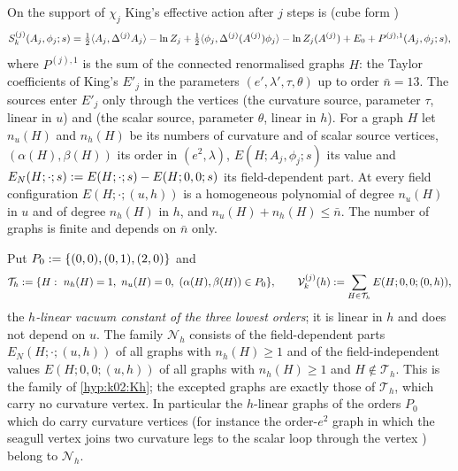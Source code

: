 On the support of $\chi_j$ King's effective action after $j$ steps is \cite[(3.14)]{K1} (cube form \cite[(3.12)]{K2})
\[
S^{(j)}_k(A_j,\phi_j;s)=\tfrac12\langle A_j,\Delta^{(j)}A_j\rangle-\ln Z_j+\tfrac12\langle \phi_j,\Delta^{(j)}(A^{(j)})\phi_j\rangle-\ln Z_j(A^{(j)})+E_0+P^{(j),1}(A_j,\phi_j;s),
\]
where $P^{(j),1}$ is the sum of the connected renormalised graphs $H$: the Taylor coefficients of King's $E'_j$ \cite[(3.17)]{K1} in the parameters $(e',\lambda',\tau,\theta)$ up to order $\bar n=13$. The sources enter $E'_j$ only through the vertices \cite[(3.20)]{K1} (the curvature source, parameter $\tau$, linear in $u$) and \cite[(3.21)]{K1} (the scalar source, parameter $\theta$, linear in $h$). For a graph $H$ let $n_u(H)$ and $n_h(H)$ be its numbers of curvature and of scalar source vertices, $(\alpha(H),\beta(H))$ its order in $(e^2,\lambda)$, $E(H;A_j,\phi_j;s)$ its value and $E_N(H;\cdot;s):= E(H;\cdot;s)-E(H;0,0;s)$ its field-dependent part. At every field configuration $E(H;\cdot;(u,h))$ is a homogeneous polynomial of degree $n_u(H)$ in $u$ and of degree $n_h(H)$ in $h$, and $n_u(H)+n_h(H)\le\bar n$. The number of graphs is finite and depends on $\bar n$ only.

\begin{definition}\label{app:a04:def:families}
Put $P_0:=\{(0,0),(0,1),(2,0)\}$ and
\[
\mathcal T_h\defeq\{H:\ n_h(H)=1,\ n_u(H)=0,\ (\alpha(H),\beta(H))\in P_0\},\qquad
\cV^{(j)}_k(h)\defeq\sum_{H\in\mathcal T_h}E(H;0,0;(0,h)),
\]
the \emph{$h$-linear vacuum constant of the three lowest orders}; it is linear in $h$ and does not depend on $u$. The family $\mathcal N_h$ consists of the field-dependent parts $E_N(H;\cdot;(u,h))$ of all graphs with $n_h(H)\ge1$ and of the field-independent values $E(H;0,0;(u,h))$ of all graphs with $n_h(H)\ge1$ and $H\notin\mathcal T_h$. This is the family of \cref{hyp:k02:Kh}; the excepted graphs are exactly those of $\mathcal T_h$, which carry no curvature vertex. In particular the $h$-linear graphs of the orders $P_0$ which do carry curvature vertices (for instance the order-$e^2$ graph in which the seagull vertex joins two curvature legs to the scalar loop through the vertex \cite[(3.21)]{K1}) belong to $\mathcal N_h$.
\end{definition}


